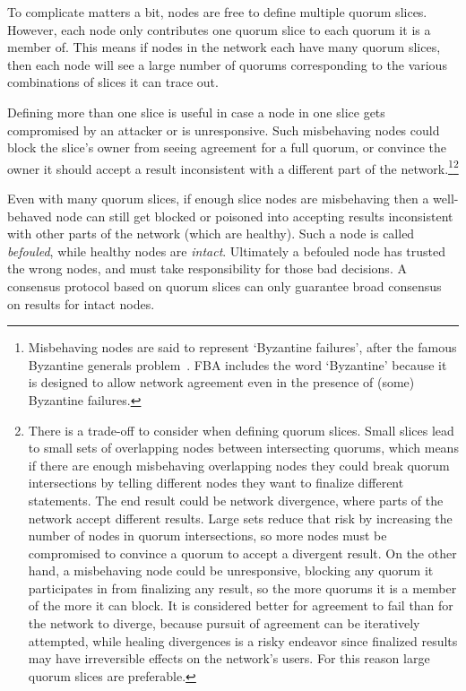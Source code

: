 To complicate matters a bit, nodes are free to define multiple quorum slices. However, each node only contributes one quorum slice to each quorum it is a member of. This means if nodes in the network each have many quorum slices, then each node will see a large number of quorums corresponding to the various combinations of slices it can trace out.

Defining more than one slice is useful in case a node in one slice gets compromised by an attacker or is unresponsive. Such misbehaving nodes could block the slice's owner from seeing agreement for a full quorum, or convince the owner it should accept a result inconsistent with a different part of the network.\footnote{Misbehaving nodes are said to represent `Byzantine failures', after the famous Byzantine generals problem~\cite{byzantine-generals-lamport}. FBA includes the word `Byzantine' because it is designed to allow network agreement even in the presence of (some) Byzantine failures.}\footnote{There is a trade-off to consider when defining quorum slices. Small slices lead to small sets of overlapping nodes between intersecting quorums, which means if there are enough misbehaving overlapping nodes they could break quorum intersections by telling different nodes they want to finalize different statements. The end result could be network divergence, where parts of the network accept different results. Large sets reduce that risk by increasing the number of nodes in quorum intersections, so more nodes must be compromised to convince a quorum to accept a divergent result. On the other hand, a misbehaving node could be unresponsive, blocking any quorum it participates in from finalizing any result, so the more quorums it is a member of the more it can block. It is considered better for agreement to fail than for the network to diverge, because pursuit of agreement can be iteratively attempted, while healing divergences is a risky endeavor since finalized results may have irreversible effects on the network's users. For this reason large quorum slices are preferable.}

Even with many quorum slices, if enough slice nodes are misbehaving then a well-behaved node can still get blocked or poisoned into accepting results inconsistent with other parts of the network (which are healthy). Such a node is called {\em befouled}, while healthy nodes are {\em intact}. Ultimately a befouled node has trusted the wrong nodes, and must take responsibility for those bad decisions. A consensus protocol based on quorum slices can only guarantee broad consensus on results for intact nodes.


